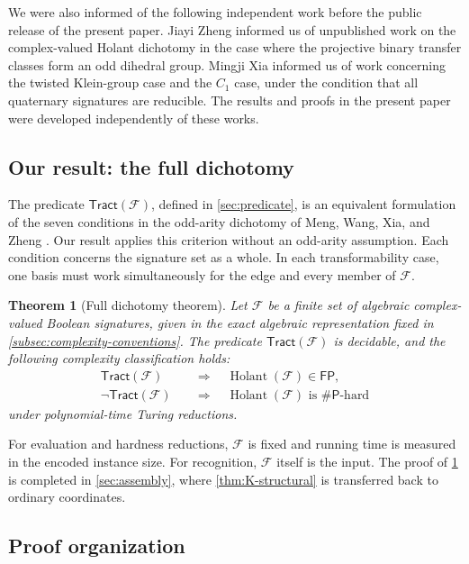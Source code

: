 \documentclass[11pt,letterpaper,onecolumn]{article}
\theoremstyle{plain}
\newtheorem{theorem}{Theorem}[section]
\theoremstyle{definition}
\theoremstyle{remark}
\newcommand{\cF}{\mathcal F}
\newcommand{\Holant}{\operatorname{Holant}}
\newcommand{\Tract}{\mathsf{Tract}}
\newcommand{\FP}{\mathsf{FP}}
\newcommand{\SharpP}{\#\mathsf P}
\begin{document}
We were also informed of the following independent work before the
public release of the present paper.
Jiayi Zheng informed us of unpublished work on the complex-valued Holant
dichotomy in the case where the projective binary transfer classes form an
odd dihedral group.
Mingji Xia informed us of work concerning the twisted Klein-group case
and the \(C_1\) case, under the condition that all quaternary signatures
are reducible.
The results and proofs in the present paper were developed independently
of these works.

\subsection{Our result: the full dichotomy}
\label{subsec:intro-main}

The predicate \(\Tract(\cF)\), defined in \cref{sec:predicate}, is an
equivalent formulation of the seven conditions in the odd-arity dichotomy
of Meng, Wang, Xia, and Zheng
\cite[conference version, Theorem~30; full version, Theorem~33]{MengWangXiaZheng2025}.
Our result applies this criterion without an odd-arity assumption.
Each condition concerns the signature set as a whole.  In each transformability
case, one basis must work simultaneously for the edge and every
member of \(\cF\).

	\begin{theorem}[Full dichotomy theorem]
		\label{thm:main}
		Let \(\cF\) be a finite set of algebraic complex-valued Boolean signatures,
		given in the exact algebraic representation fixed in
		\cref{subsec:complexity-conventions}.  The predicate \(\Tract(\cF)\)
		is decidable, and the following complexity classification holds:
		\[
		\begin{aligned}
			\Tract(\cF)
			&\quad\Longrightarrow\quad \Holant(\cF)\in\FP,\\
			\neg\Tract(\cF)
			&\quad\Longrightarrow\quad
			\Holant(\cF)\text{ is }\SharpP\text{-hard}
		\end{aligned}
		\]
		under polynomial-time Turing reductions.
	\end{theorem}

For evaluation and hardness reductions, \(\cF\) is fixed and running time
is measured in the encoded instance size. For recognition, \(\cF\) itself
is the input.
The proof of \cref{thm:main} is completed in \cref{sec:assembly}, where
\cref{thm:K-structural} is transferred back to ordinary coordinates.

\subsection{Proof organization}
\label{subsec:proof-sketch}
\end{document}
